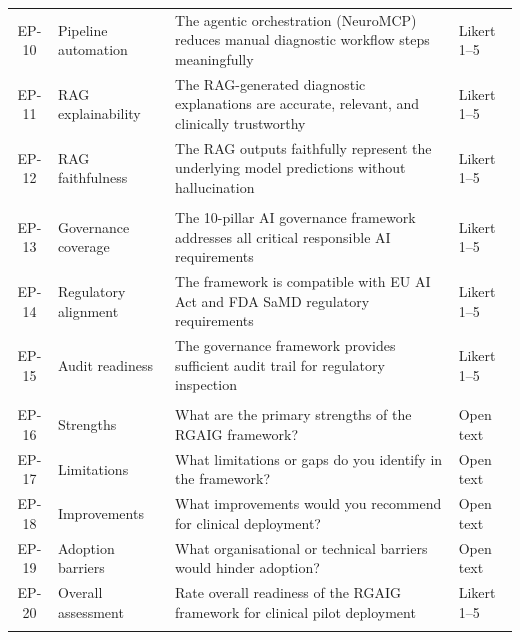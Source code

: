 \begin{xltabular}{\textwidth}{@{} c l X l @{}}
\addlinespace
\midrule
{} \\
\midrule
EP-10 & Pipeline automation   & The agentic orchestration (NeuroMCP) reduces manual diagnostic workflow steps meaningfully & Likert 1--5 \\
\addlinespace
EP-11 & RAG explainability    & The RAG-generated diagnostic explanations are accurate, relevant, and clinically trustworthy & Likert 1--5 \\
\addlinespace
EP-12 & RAG faithfulness      & The RAG outputs faithfully represent the underlying model predictions without hallucination & Likert 1--5 \\
\addlinespace
\midrule
{} \\
\midrule
EP-13 & Governance coverage   & The 10-pillar AI governance framework addresses all critical responsible AI requirements & Likert 1--5 \\
\addlinespace
EP-14 & Regulatory alignment  & The framework is compatible with EU AI Act and FDA SaMD regulatory requirements & Likert 1--5 \\
\addlinespace
EP-15 & Audit readiness       & The governance framework provides sufficient audit trail for regulatory inspection & Likert 1--5 \\
\addlinespace
\midrule
{} \\
\midrule
EP-16 & Strengths             & What are the primary strengths of the RGAIG framework? & Open text \\
\addlinespace
EP-17 & Limitations           & What limitations or gaps do you identify in the framework? & Open text \\
\addlinespace
EP-18 & Improvements          & What improvements would you recommend for clinical deployment? & Open text \\
\addlinespace
EP-19 & Adoption barriers     & What organisational or technical barriers would hinder adoption? & Open text \\
\addlinespace
EP-20 & Overall assessment    & Rate overall readiness of the RGAIG framework for clinical pilot deployment & Likert 1--5 \\
\addlinespace
\midrule
{} \\
\end{xltabular}
\endgroup

